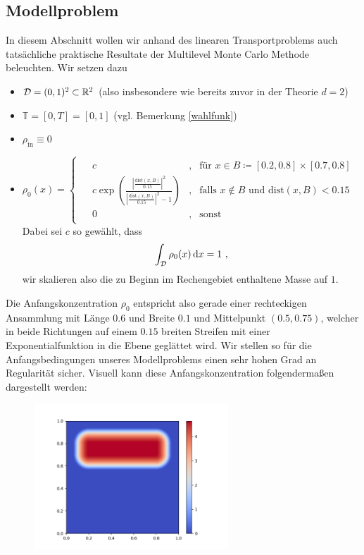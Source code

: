 
\subsection{Modellproblem}

In diesem Abschnitt wollen wir anhand des linearen Transportproblems auch tatsächliche praktische Resultate der Multilevel Monte Carlo Methode beleuchten.
Wir setzen dazu
\begin{itemize}
	\item $ \mathcal{D} = (0,1)^2 \subset \mathbb{R}^2 $ (also insbesondere wie bereits zuvor in der Theorie $ d=2 $)
	\item $ \mathbb{T} = [0,T] = [0,1] $ (vgl. Bemerkung \ref{wahlfunk})
	\item $ \rho_{\text{in}} \equiv 0 $
	\item $ \rho_0(x) = 
	\begin{cases*}
		\begin{array}{llll}
			&c & , &\text{für }x \in B \coloneqq [0.2,0.8] \times [0.7 ,0.8]  \\
			&c\exp \left(\frac{ \left| \frac{\text{dist}(x,B)}{0.15} \right| ^2}{\left|\frac{\text{dist}(x,B)}{0.15}\right|^2-1}\right) &, &\text{falls } x \not \in B \text{ und dist}(x,B) < 0.15 \\
			&0 &, & \text{sonst}
		\end{array}
	\end{cases*}$ \\
	Dabei sei $ c $ so gewählt, dass 
	\[
		\int_{\mathcal{D}} \rho_0(x) \, \mathrm{d} x = 1 \ ,
	\]
	wir skalieren also die zu Beginn im Rechengebiet enthaltene Masse auf $ 1 $.
\end{itemize} 
Die Anfangskonzentration $ \rho_0 $ entspricht also gerade einer rechteckigen Ansammlung mit Länge $ 0.6$ und Breite $ 0.1$ und Mittelpunkt $ (0.5,0.75) $, welcher in beide Richtungen auf einem $ 0.15$ breiten Streifen mit einer Exponentialfunktion in die Ebene geglättet wird. 
Wir stellen so für die Anfangsbedingungen unseres Modellproblems einen sehr hohen Grad an Regularität sicher. 
Visuell kann diese Anfangskonzentration folgendermaßen dargestellt werden:
\begin{figure}[H]
	\centering
	\includegraphics[width=0.65\textwidth]{plots/anfangsbedingung.png} 
\end{figure}
